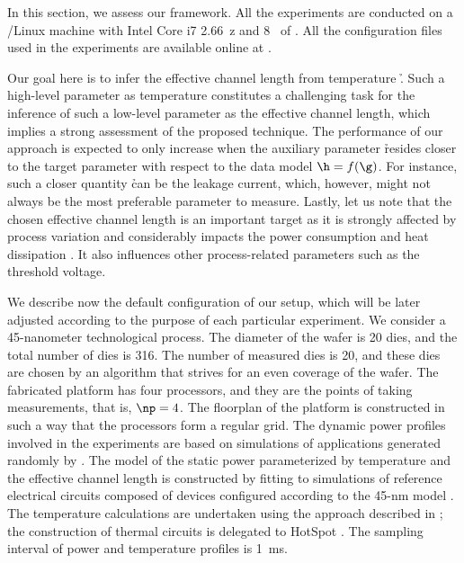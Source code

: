 In this section, we assess our framework. All the experiments are conducted on a
/Linux machine with Intel Core i7 2.66~z and 8~ of
. All the configuration files used in the experiments are available
online at \cite{eslab2013}.

Our goal here is to infer the effective channel length \g from temperature \h.
Such a high-level parameter as temperature constitutes a challenging task for
the inference of such a low-level parameter as the effective channel length,
which implies a strong assessment of the proposed technique. The performance of
our approach is expected to only increase when the auxiliary parameter \h
resides closer to the target parameter \g with respect to the data model $\h =
f(\g)$. For instance, such a closer quantity \h can be the leakage current,
which, however, might not always be the most preferable parameter to measure.
Lastly, let us note that the chosen effective channel length is an important
target as it is strongly affected by process variation and considerably impacts
the power consumption and heat dissipation \cite{chandrakasan2000,
srivastava2010, juan2012}. It also influences other process-related parameters
such as the threshold voltage.

We describe now the default configuration of our setup, which will be later
adjusted according to the purpose of each particular experiment. We consider a
45-nanometer technological process. The diameter of the wafer is 20 dies, and
the total number of dies \nd is 316. The number of measured dies \hnd is 20, and
these dies are chosen by an algorithm that strives for an even coverage of the
wafer. The fabricated platform has four processors, and they are the points of
taking measurements, that is, $\np = 4$. The floorplan of the platform is
constructed in such a way that the processors form a regular grid. The dynamic
power profiles involved in the experiments are based on simulations of
applications generated randomly by  \cite{dick1998}. The model of the
static power parameterized by temperature and the effective channel length is
constructed by fitting to  simulations of reference electrical
circuits composed of  devices \cite{bsim} configured according to the
45-nm   model \cite{ptm}. The temperature calculations are
undertaken using the approach described in ; the
construction of thermal  circuits is delegated to HotSpot
\cite{skadron2003}. The sampling interval of power and temperature profiles is
1~ms.

